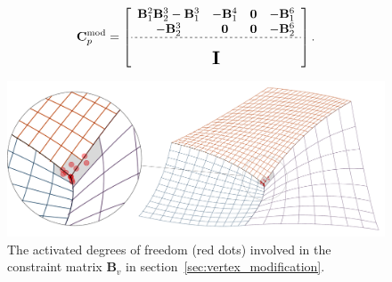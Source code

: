 \begin{equation}
  \mathbf{C}^\text{mod}_p =
  \left[\begin{array}{cccc}
      {\mathbf{B}}_1^2{\mathbf{B}}_2^3-{\mathbf{B}}_1^3 & -{\mathbf{B}}_1^4 & \mathbf{0} & -{\mathbf{B}}_1^6 \\
      -{\mathbf{B}}_2^3                                 & \mathbf{0}        & \mathbf{0} & -{\mathbf{B}}_2^6 \\ \hdashline[2pt/2pt]
      \multicolumn{4}{c}{\multirow{3}{*}{\raisebox{0mm}{\scalebox{1.5}{$\mathbf{I}$}}}}                      \\
                                                        &                   &            &
    \end{array}\right].\label{eq:nullspace_modification}
\end{equation}

\begin{figure}[ht]
  \centering
  \includegraphics[width=\linewidth]{mesh_spy_modify}
  \caption{The activated degrees of freedom (red dots) involved in the constraint matrix $\mathbf{B}_v$ in section~\ref{sec:vertex_modification}.}\label{fig:cross_point_dof_modify}
\end{figure}

